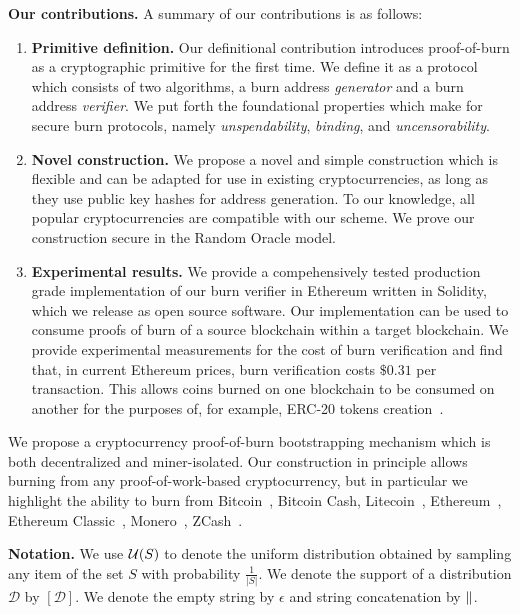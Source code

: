 \noindent
\textbf{Our contributions.}
A summary of our contributions is as follows:
\begin{enumerate}[wide, labelwidth=!, labelindent=0pt, label=(\roman*)]
    \item \textbf{Primitive definition.} Our definitional contribution introduces proof-of-burn as a cryptographic primitive for the first time. We
    define it as a protocol which consists of two algorithms, a burn address \emph{generator} and a burn address \emph{verifier}. We put forth the foundational properties which make for secure burn protocols, namely \emph{unspendability}, \emph{binding}, and \emph{uncensorability}.
    \item \textbf{Novel construction.} We propose a novel and simple construction which is flexible and can be adapted for use in existing cryptocurrencies, as long as they use public key hashes for address generation. To our knowledge, all popular cryptocurrencies are
    compatible with our scheme. We prove our construction secure in the Random Oracle model.
    \item \textbf{Experimental results.} We provide a compehensively tested production grade implementation of our burn verifier in Ethereum
    written in Solidity, which we release as open source software. Our implementation can be used to consume proofs of burn of a source blockchain
    within a target blockchain. We provide experimental measurements for the cost of burn verification and find that, in current Ethereum prices,
    burn verification costs $\$0.31$ per transaction.
    This allows coins burned on one blockchain to be consumed on another for the purposes of, for example, ERC-20 tokens creation~\cite{erc20}.
\end{enumerate}

We propose a cryptocurrency proof-of-burn bootstrapping mechanism which is both
decentralized and miner-isolated. Our construction in principle allows burning
from any proof-of-work-based cryptocurrency, but in particular we highlight the
ability to burn from Bitcoin~\cite{bitcoin},
Bitcoin Cash, Litecoin~\cite{lee2011litecoin},
Ethereum~\cite{buterin2014next,wood2014ethereum}, Ethereum
Classic~\cite{classic2017ethereum}, Monero~\cite{van2013cryptonote},
ZCash~\cite{SP:BCGGMT14,hopwood2016zcash}.

\noindent
\textbf{Notation.} We use $\mathcal{U}(S)$ to denote the uniform distribution
obtained by sampling any item of the set $S$ with probability $\frac{1}{|S|}$.
We denote the support of a distribution $\mathcal{D}$ by $[\mathcal{D}]$.
We denote the empty string by $\epsilon$ and string concatenation by $\mathbin{\|}$.
